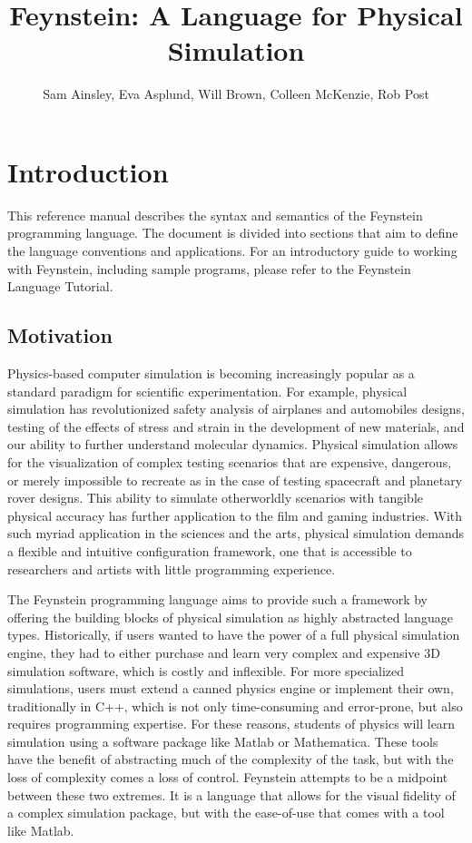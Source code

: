 \documentclass[letterpaper]{article}
\title{Feynstein: A Language for Physical Simulation}
\author{Sam Ainsley, Eva Asplund, Will Brown, Colleen McKenzie, Rob
  Post}
\begin{document}
 
\maketitle

\tableofcontents

\section{Introduction}
This reference manual describes the syntax and semantics of the
Feynstein programming language. The document is divided into
sections that aim to define the language conventions and
applications. For an introductory guide to working with Feynstein,
including sample programs, please refer to the Feynstein Language
Tutorial.

\subsection{Motivation}

Physics-based computer simulation is becoming increasingly popular as
a standard paradigm for scientific experimentation. For example,
physical simulation has revolutionized safety analysis of airplanes
and automobiles designs, testing of the effects of stress and strain
in the development of new materials, and our ability to further
understand molecular dynamics. Physical simulation allows for the
visualization of complex testing scenarios that are expensive,
dangerous, or merely impossible to recreate as in the case of testing
spacecraft and planetary rover designs. This ability to simulate
otherworldly scenarios with tangible physical accuracy has further
application to the film and gaming industries. With such myriad
application in the sciences and the arts, physical simulation demands
a flexible and intuitive configuration framework, one that is
accessible to researchers and artists with little programming
experience. 

The Feynstein programming language aims to provide such a framework by
offering the building blocks of physical simulation as highly
abstracted language types. Historically, if users wanted to have the
power of a full physical simulation engine, they had to either
purchase and learn very complex and expensive 3D simulation software,
which is costly and inflexible. For more specialized simulations,
users must extend a canned physics engine or implement their own,
traditionally in C++, which is not only time-consuming and
error-prone, but also requires programming expertise. For these
reasons, students of physics will learn simulation using a software
package like Matlab or Mathematica. These tools have the benefit of
abstracting much of the complexity of the task, but with the loss of
complexity comes a loss of control. Feynstein attempts to be a
midpoint between these two extremes. It is a language that allows for
the visual fidelity of a complex simulation package, but with the
ease-of-use that comes with a tool like Matlab.
\end{document}
